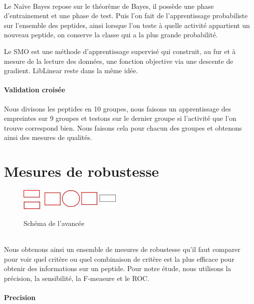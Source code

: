 \documentclass[a4paper,10pt]{report}
\begin{document}
	  ~\\Le Naïve Bayes repose sur le théorème de Bayes, il possède une phase d'entrainement et une phase de test.
	  Puis l'on fait de l'apprentissage probabiliste sur l'ensemble des peptides, ainsi lorsque l'on teste à quelle activité appartient un nouveau peptide, on conserve la classe qui a la plus grande probabilité.  
	    
	  Le SMO est une méthode d'apprentissage supervisé qui construit, au fur et à mesure de la lecture des données, une fonction objective via une descente de gradient.   
	  LibLinear reste dans la même idée.
	      
	  \paragraph{Validation croisée}
	    
	  Nous divisons les peptides en 10 groupes, nous faisons un apprentissage des empreintes sur 9 groupes et testons sur le dernier groupe si l'activité que l'on trouve correspond bien. Nous faisons cela pour chacun des groupes et obtenons ainsi des mesures de qualités.
	    
     \section{Mesures de robustesse}
     
	  \begin{figure}[!h]
	    \begin{center}
	      \includegraphics[width=5cm]{image/step4.jpeg} \\
	      \caption{Schéma de l'avancée}
	    \end{center}
	 \end{figure}
	  
	  ~\\
	  Nous obtenons ainsi un ensemble de mesures de robustesse qu'il faut comparer pour voir quel critère ou quel combinaison de critère est la plus efficace pour obtenir des informations sur un peptide.
	  Pour notre étude, nous utilisons la précision, la sensibilité, la F-measure et le ROC.
	     
	     \paragraph{Precision}\\
	      
\end{document}
